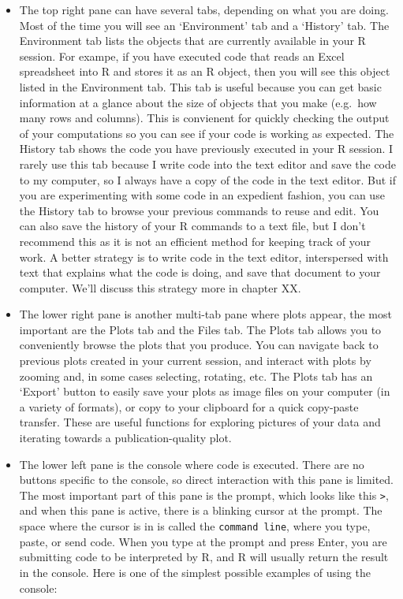 \documentclass[]{book}
\begin{document}
\begin{itemize}
\item
  The top right pane can have several tabs, depending on what you are
  doing. Most of the time you will see an `Environment' tab and a
  `History' tab. The Environment tab lists the objects that are
  currently available in your R session. For exampe, if you have
  executed code that reads an Excel spreadsheet into R and stores it as
  an R object, then you will see this object listed in the Environment
  tab. This tab is useful because you can get basic information at a
  glance about the size of objects that you make (e.g.~how many rows and
  columns). This is convienent for quickly checking the output of your
  computations so you can see if your code is working as expected. The
  History tab shows the code you have previously executed in your R
  session. I rarely use this tab because I write code into the text
  editor and save the code to my computer, so I always have a copy of
  the code in the text editor. But if you are experimenting with some
  code in an expedient fashion, you can use the History tab to browse
  your previous commands to reuse and edit. You can also save the
  history of your R commands to a text file, but I don't recommend this
  as it is not an efficient method for keeping track of your work. A
  better strategy is to write code in the text editor, interspersed with
  text that explains what the code is doing, and save that document to
  your computer. We'll discuss this strategy more in chapter XX.
\item
  The lower right pane is another multi-tab pane where plots appear, the
  most important are the Plots tab and the Files tab. The Plots tab
  allows you to conveniently browse the plots that you produce. You can
  navigate back to previous plots created in your current session, and
  interact with plots by zooming and, in some cases selecting, rotating,
  etc. The Plots tab has an `Export' button to easily save your plots as
  image files on your computer (in a variety of formats), or copy to
  your clipboard for a quick copy-paste transfer. These are useful
  functions for exploring pictures of your data and iterating towards a
  publication-quality plot.
\item
  The lower left pane is the console where code is executed. There are
  no buttons specific to the console, so direct interaction with this
  pane is limited. The most important part of this pane is the prompt,
  which looks like this \texttt{\textgreater{}}, and when this pane is
  active, there is a blinking cursor at the prompt. The space where the
  cursor is in is called the \texttt{command\ line}, where you type,
  paste, or send code. When you type at the prompt and press Enter, you
  are submitting code to be interpreted by R, and R will usually return
  the result in the console. Here is one of the simplest possible
  examples of using the console:
\end{itemize}
\end{document}
